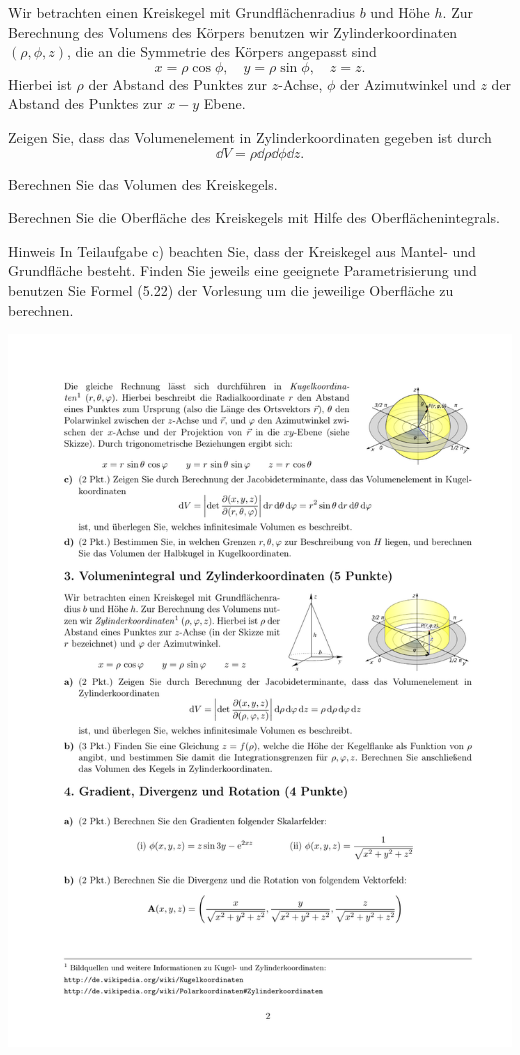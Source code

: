 \documentclass{scrartcl}
\begin{document}
Wir betrachten einen Kreiskegel mit Grundflächenradius $b$ und Höhe $h$.
Zur Berechnung des Volumens des Körpers benutzen wir Zylinderkoordinaten $(\rho,\phi,z)$, die an die Symmetrie des Körpers angepasst sind
\[
  x = \rho \cos \phi, \quad y = \rho \sin \phi, \quad z = z.
\]
Hierbei ist $\rho$ der Abstand des Punktes zur $z$-Achse, $\phi$ der Azimutwinkel und $z$ der Abstand des Punktes zur $x-y$ Ebene.
\begin{subex}
  \item{} Zeigen Sie, dass das Volumenelement in Zylinderkoordinaten gegeben ist durch
  \[
    \dd V = \rho \dd \rho \dd \phi \dd z.
  \]

  \item{} Berechnen Sie das Volumen des Kreiskegels.

  \item{} Berechnen Sie die Oberfläche des Kreiskegels mit Hilfe des Oberflächenintegrals.
\end{subex}
\begin{remark}{Hinweis}
  In Teilaufgabe c) beachten Sie, dass der Kreiskegel aus Mantel- und Grundfläche besteht.
  Finden Sie jeweils eine geeignete Parametrisierung und benutzen Sie Formel (5.22) der Vorlesung um die jeweilige Oberfläche zu berechnen.
\end{remark}

\begin{center}
  \includegraphics{img/cylinder.pdf}
\end{center}
\end{document}
